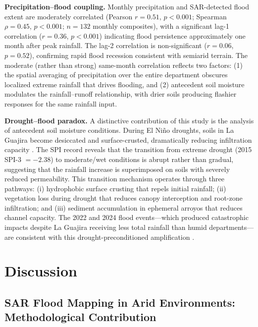 \documentclass{article}
\begin{document}
\textbf{Precipitation--flood coupling.} Monthly precipitation and SAR-detected flood extent are moderately correlated (Pearson $r = 0.51$, $p < 0.001$; Spearman $\rho = 0.45$, $p < 0.001$; $n = 132$ monthly composites), with a significant lag-1 correlation ($r = 0.36$, $p < 0.001$) indicating flood persistence approximately one month after peak rainfall. The lag-2 correlation is non-significant ($r = 0.06$, $p = 0.52$), confirming rapid flood recession consistent with semiarid terrain. The moderate (rather than strong) same-month correlation reflects two factors: (1) the spatial averaging of precipitation over the entire department obscures localized extreme rainfall that drives flooding, and (2) antecedent soil moisture modulates the rainfall--runoff relationship, with drier soils producing flashier responses for the same rainfall input.

\textbf{Drought--flood paradox.} A distinctive contribution of this study is the analysis of antecedent soil moisture conditions. During El Ni\~no droughts, soils in La Guajira become desiccated and surface-crusted, dramatically reducing infiltration capacity \citep{Alabbad2023}. The SPI record reveals that the transition from extreme drought (2015 SPI-3 $= -2.38$) to moderate/wet conditions is abrupt rather than gradual, suggesting that the rainfall increase is superimposed on soils with severely reduced permeability. This transition mechanism operates through three pathways: (i) hydrophobic surface crusting that repels initial rainfall; (ii) vegetation loss during drought that reduces canopy interception and root-zone infiltration; and (iii) sediment accumulation in ephemeral arroyos that reduces channel capacity. The 2022 and 2024 flood events---which produced catastrophic impacts despite La Guajira receiving less total rainfall than humid departments---are consistent with this drought-preconditioned amplification \citep{DroughtFloodMonitoring2024}.

\section{Discussion}
\label{sec:discussion}

\subsection{SAR Flood Mapping in Arid Environments: Methodological Contribution}
\end{document}
